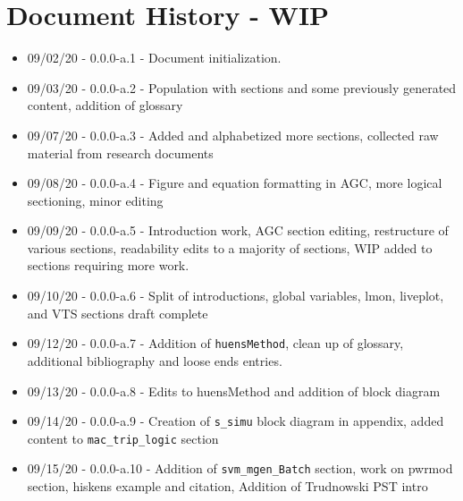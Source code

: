 \chapter{Document History  - WIP}

\begin{itemize}
\itemsep 0em
\item 09/02/20 - 0.0.0-a.1 - Document initialization.
\item 09/03/20 - 0.0.0-a.2 - Population with sections and some previously generated content, addition of glossary
\item 09/07/20 - 0.0.0-a.3 - Added and alphabetized more sections, collected raw material from research documents
\item 09/08/20 - 0.0.0-a.4 - Figure and equation formatting in AGC, more logical sectioning, minor editing
\item 09/09/20 - 0.0.0-a.5 - Introduction work, AGC section editing, restructure of various sections, readability edits to a majority of sections, WIP added to sections requiring more work.
\item 09/10/20 - 0.0.0-a.6 - Split of introductions, global variables, lmon, liveplot, and VTS sections draft complete
\item 09/12/20 - 0.0.0-a.7 - Addition of \verb|huensMethod|, clean up of glossary, additional bibliography and loose ends entries.
\item 09/13/20 - 0.0.0-a.8 - Edits to huensMethod and addition of block diagram 
\item 09/14/20 - 0.0.0-a.9 - Creation of \verb|s_simu| block diagram in appendix, added content to \verb|mac_trip_logic| section
\item 09/15/20 - 0.0.0-a.10 - Addition of \verb|svm_mgen_Batch| section, work on pwrmod section, hiskens example and citation, Addition of Trudnowski PST intro
\end{itemize}